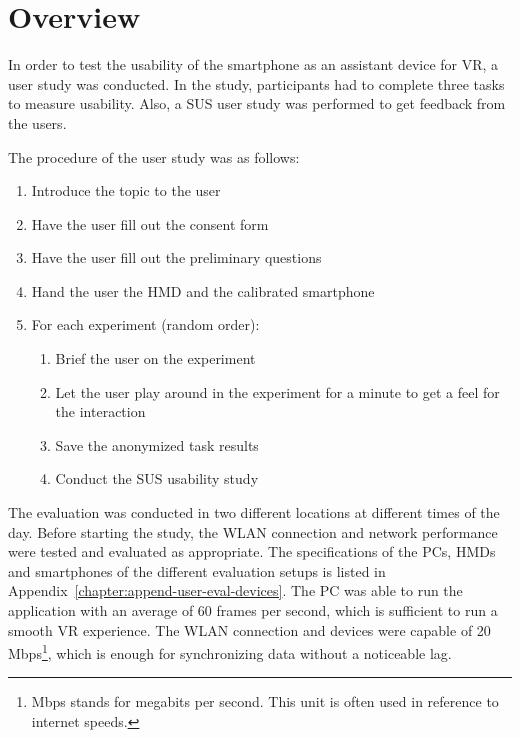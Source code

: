 \section{Overview}\label{section:evaluation-overview}
In order to test the usability of the smartphone as an assistant device for \gls{VR}, a user study was conducted. In the study, participants had to complete three tasks to measure usability. Also, a \gls{SUS} user study was performed to get feedback from the users.

The procedure of the user study was as follows:
\begin{enumerate}
  \item Introduce the topic to the user
  \item Have the user fill out the consent form
  \item Have the user fill out the preliminary questions
  \item Hand the user the \gls{HMD} and the calibrated smartphone
  \item For each experiment (random order):
  \begin{enumerate}
    \item Brief the user on the experiment
    \item Let the user play around in the experiment for a minute to get a feel for the interaction
    \item Save the anonymized task results
    \item Conduct the \gls{SUS} usability study
  \end{enumerate}
\end{enumerate}

The evaluation was conducted in two different locations at different times of the day. Before starting the study, the \gls{WLAN} connection and network performance were tested and evaluated as appropriate. The specifications of the \glspl{PC}, \glspl{HMD} and smartphones of the different evaluation setups is listed in Appendix~\ref{chapter:append-user-eval-devices}. The \gls{PC} was able to run the application with an average of 60 frames per second, which is sufficient to run a smooth \gls{VR} experience. The \gls{WLAN} connection and devices were capable of 20 Mbps\footnote{Mbps stands for megabits per second. This unit is often used in reference to internet speeds.}, which is enough for synchronizing data without a noticeable lag.

